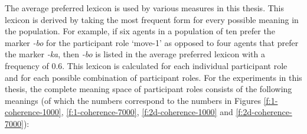 The average preferred lexicon is used by various measures in this thesis. This lexicon is derived by taking the most frequent form for every possible meaning in the population. For example, if six agents in a population of ten prefer the marker {\em -bo} for the participant role `move-1' as opposed to four agents that prefer the marker {\em -ka}, then {\em -bo} is listed in the average preferred lexicon with a frequency of 0.6. This lexicon is calculated for each individual participant role and for each possible combination of participant roles. For the experiments in this thesis, the complete meaning space of participant roles consists of the following meanings (of which the numbers correspond to the numbers in Figures \ref{f:1-coherence-1000}, \ref{f:1-coherence-7000}, \ref{f:2d-coherence-1000} and \ref{f:2d-coherence-7000}):

